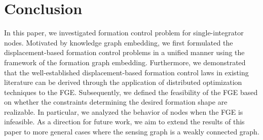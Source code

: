 \documentclass{ifacconf}
\begin{document}

\section{Conclusion}	\label{sec_conclusion}
In this paper, we investigated formation control problem for single-integrator nodes. 
Motivated by knowledge graph embedding, we first formulated the displacement-based formation control problems in a unified manner using the framework of the formation graph embedding. 
Furthermore, we demonstrated that the well-established displacement-based formation control laws in existing literature can be derived through the application of distributed optimization techniques to the FGE.
Subsequently, we defined the feasibility of the FGE based on whether the constraints determining the desired formation shape are realizable. In particular, we analyzed the behavior of nodes when the FGE is infeasible. As a direction for future work, we aim to extend the results of this paper to more general cases where the sensing graph is a weakly connected graph. 



                                                   
\end{document}
